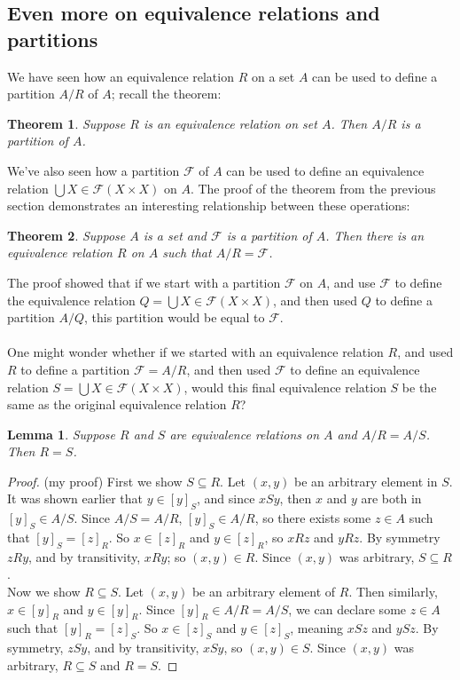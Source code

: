\documentclass{report}
\newtheorem*{theorem}{Theorem}
\newtheorem*{lemma}{Lemma}
\theoremstyle{definition}
\begin{document}
\subsection{Even more on equivalence relations and partitions}
We have seen how an equivalence relation $R$ on a set $A$ can be used to define a partition $A/R$ of $A$; recall the theorem:
\begin{theorem}
Suppose $R$ is an equivalence relation on set $A$. Then $A/R$ is a partition of $A$.
\end{theorem}
\noindent We've also seen how a partition $\mathcal F$ of $A$ can be used to define an equivalence relation $\bigcup X\in\mathcal F(X\times X)$ on $A$. The proof of the theorem from the previous
section demonstrates an interesting relationship between these operations:
\begin{theorem}
Suppose $A$ is a set and $\mathcal F$ is a partition of $A$. Then there is an equivalence relation $R$ on $A$ such that $A/R=\mathcal F$.
\end{theorem}
\noindent The proof showed that if we start with a partition $\mathcal F$ on $A$, and use $\mathcal F$ to define the equivalence relation $Q=\bigcup X\in\mathcal F(X\times X)$, and then used 
$Q$ to define a partition $A/Q$, this partition would be equal to $\mathcal F$.\\
\vspace{1mm}\\
One might wonder whether if we started with an equivalence relation $R$, and used $R$ to define a partition $\mathcal F=A/R$, and then used $\mathcal F$ to define an equivalence relation 
$S=\bigcup X\in\mathcal F(X\times X)$, would this final equivalence relation $S$ be the same as the original equivalence relation $R$?
\begin{lemma}
Suppose $R$ and $S$ are equivalence relations on $A$ and $A/R=A/S$. Then $R=S$.
\end{lemma}
\begin{proof}(my proof)
First we show $S\subseteq R$. Let $(x,y)$ be an arbitrary element in $S$. It was shown earlier that $y\in[y]_S$, and since $xSy$, then $x$ and $y$ are both in $[y]_S\in A/S$.
Since $A/S=A/R$, $[y]_S\in A/R$, so there exists some $z\in A$ such that $[y]_S=[z]_R$. 
So $x\in[z]_R$ and $y\in[z]_R$, so $xRz$ and $yRz$. By symmetry $zRy$, and by transitivity, $xRy$; so $(x,y)\in R$. Since $(x,y)$ was arbitrary, $S\subseteq R$.\\
\indent Now we show $R\subseteq S$. Let $(x,y)$ be an arbitrary element of $R$. Then similarly, $x\in[y]_R$ and $y\in[y]_R$. Since $[y]_R\in A/R=A/S$, we can declare some $z\in A$ such that
$[y]_R=[z]_S$. So $x\in[z]_S$ and $y\in[z]_S$, meaning $xSz$ and $ySz$. By symmetry, $zSy$, and by transitivity, $xSy$, so $(x,y)\in S$. Since $(x,y)$ was arbitrary, $R\subseteq S$ and $R=S$.
\end{proof}
\end{document}
